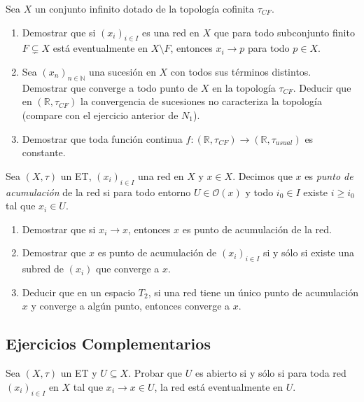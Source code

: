 \documentclass{article}
\theoremstyle{definition}
\newcommand{\R}{\mathbb{R}}
\newcommand{\N}{\mathbb{N}}
\newcommand{\Ent}[1]{\mathcal{O}(#1)}           %
\newenvironment{ejercicio}[1]{\begin{trivlist}
\item[\hskip \labelsep {\bfseries Ejercicio}\hskip \labelsep {\bfseries #1.}]}{\end{trivlist}}
\begin{document}
\begin{ejercicio}{11}
    Sea \(X\) un conjunto infinito dotado de la topología cofinita \(\tau_{CF}\).
    \begin{enumerate}
        \item Demostrar que si \({(x_i)}_{i \in I}\) es una red en \(X\) que para todo subconjunto finito \(F \subsetneq X\) está eventualmente en \(X \setminus F\), entonces \(x_i \to p\) para todo \(p \in X\).
        \item Sea \({(x_n)}_{n \in \N}\) una sucesión en \(X\) con todos sus términos distintos. Demostrar que converge a todo punto de \(X\) en la topología \(\tau_{CF}\). Deducir que en \((\R, \tau_{CF})\) la convergencia de sucesiones no caracteriza la topología (compare con el ejercicio anterior de \(N_1\)).
        \item Demostrar que toda función continua \(f : (\R, \tau_{CF}) \to (\R, \tau_{usual})\) es constante.
    \end{enumerate}
\end{ejercicio}

\begin{ejercicio}{12}
    Sea \((X, \tau)\) un ET, \({(x_i)}_{i \in I}\) una red en \(X\) y \(x \in X\). Decimos que \(x\) es \textit{punto de acumulación} de la red si para todo entorno \(U \in \Ent{x}\) y todo \(i_0 \in I\) existe \(i \geq i_0\) tal que \(x_i \in U\).
    \begin{enumerate}
        \item Demostrar que si \(x_i \to x\), entonces \(x\) es punto de acumulación de la red.
        \item Demostrar que \(x\) es punto de acumulación de \({(x_i)}_{i \in I}\) si y sólo si existe una subred de \({(x_i)}\) que converge a \(x\).
        \item Deducir que en un espacio \(T_2\), si una red tiene un único punto de acumulación \(x\) y converge a algún punto, entonces converge a \(x\).
    \end{enumerate}
\end{ejercicio}

\clearpage

\subsection*{Ejercicios Complementarios}
\begin{ejercicio}{C1}
    Sea \((X, \tau)\) un ET y \(U \subseteq X\). Probar que \(U\) es abierto si y sólo si para toda red \({(x_i)}_{i \in I}\) en \(X\) tal que \(x_i \to x \in U\), la red está eventualmente en \(U\).
\end{ejercicio}
\end{document}
